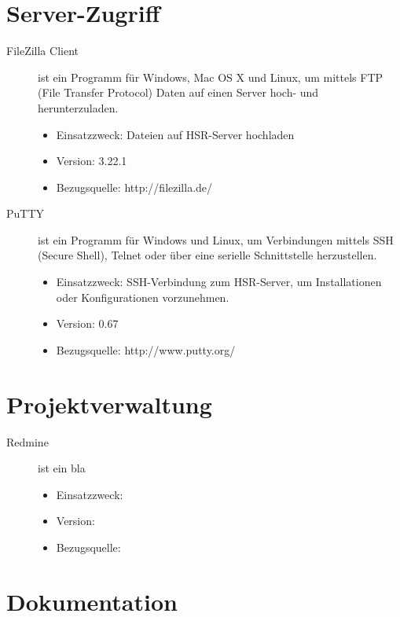 \newpage
\section{Server-Zugriff}

\begin{description}
	\item [FileZilla Client] ist ein Programm für Windows, Mac OS X und Linux, um mittels FTP (File Transfer Protocol) Daten auf einen Server hoch- und herunterzuladen. \cite{wikipedia_filezilla}
	\begin{itemize}
		\item Einsatzzweck: Dateien auf HSR-Server hochladen
		\item Version: 3.22.1
		\item Bezugsquelle: http://filezilla.de/
	\end{itemize}
	
	
	
	\item [PuTTY] ist ein Programm für Windows und Linux, um Verbindungen mittels SSH (Secure Shell), Telnet oder über eine serielle Schnittstelle herzustellen. \cite{wikipedia_putty}
	\begin{itemize}
		\item Einsatzzweck: SSH-Verbindung zum HSR-Server, um Installationen oder Konfigurationen vorzunehmen.
		\item Version: 0.67
		\item Bezugsquelle: http://www.putty.org/
	\end{itemize}
\end{description}



\section{Projektverwaltung}

\begin{description}
	\item [Redmine] ist ein bla
	\begin{itemize}
		\item Einsatzzweck:
		\item Version:
		\item Bezugsquelle:
	\end{itemize}
\end{description}



\section{Dokumentation}

